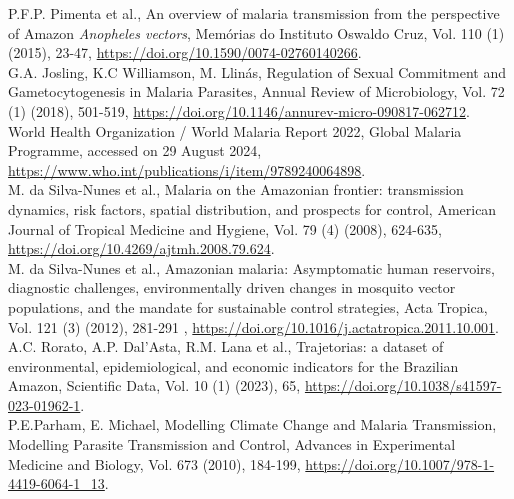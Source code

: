 \documentclass[a4paper,fleqn]{cas-dc}
\begin{document}
 \begin{thebibliography}{00}


 P.F.P. Pimenta et al., An overview of malaria transmission from the perspective of Amazon \emph{Anopheles vectors}, Memórias do Instituto Oswaldo Cruz, Vol. 110 (1) (2015), 23-47, \href{https://doi.org/10.1590/0074-02760140266}{https://doi.org/10.1590/0074-02760140266}.
\\
 G.A. Josling, K.C Williamson, M. Llinás, Regulation of Sexual Commitment and Gametocytogenesis in Malaria Parasites, Annual Review of Microbiology, Vol. 72 (1) (2018), 501-519, \href{https://doi.org/10.1146/annurev-micro-090817-062712}{https://doi.org/10.1146/annurev-micro-090817-062712}.
\\
 World Health Organization / World Malaria Report 2022, Global Malaria Programme, accessed on 29 August 2024, \href{https://www.who.int/publications/i/item/9789240064898}{https://www.who.int/publications/i/item/9789240064898}.
\\
 M. da Silva-Nunes et al., Malaria on the Amazonian frontier: transmission dynamics, risk factors, spatial distribution, and prospects for control, American Journal of Tropical Medicine and Hygiene, Vol. 79 (4) (2008), 624-635, \href{https://doi.org/10.4269/ajtmh.2008.79.624}{https://doi.org/10.4269/ajtmh.2008.79.624}. 
\\
 M. da Silva-Nunes et al.,  Amazonian malaria: Asymptomatic human reservoirs, diagnostic challenges, environmentally driven changes in mosquito vector populations, and the mandate for sustainable control strategies, Acta Tropica, Vol. 121 (3) (2012), 281-291 , \href{https://doi.org/10.1016/j.actatropica.2011.10.001}{https://doi.org/10.1016/j.actatropica.2011.10.001}.
\\
 A.C. Rorato, A.P. Dal’Asta, R.M. Lana et al., Trajetorias: a dataset of environmental, epidemiological, and economic indicators for the Brazilian Amazon, Scientific Data, Vol. 10 (1) (2023), 65, \href{https://doi.org/10.1038/s41597-023-01962-1}{https://doi.org/10.1038/s41597-023-01962-1}.
\\
 P.E.Parham, E. Michael, Modelling Climate Change and Malaria Transmission, Modelling Parasite Transmission and Control, Advances in Experimental Medicine and Biology, Vol. 673 (2010), 184-199, \href{https://doi.org/10.1007/978-1-4419-6064-1_13}{https://doi.org/10.1007/978-1-4419-6064-1\_13}.

\end{thebibliography}
\end{document}
